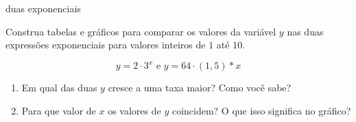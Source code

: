 \begin{task}{duas exponenciais}

Construa tabelas e gráficos para comparar os valores da variável $y$ nas duas expressões exponenciais para valores inteiros de $1$ até $10$.

\begin{equation*}
y=2\cdot3^x \text{ e } y=64\cdot(1,5)*x
\end{equation*}

\begin{enumerate}
\item Em qual das duas $y$ cresce a uma taxa maior? Como você sabe?
\item Para que valor de $x$ os valores de $y$ coincidem? O que isso significa no gráfico?
\end{enumerate}
\end{task}